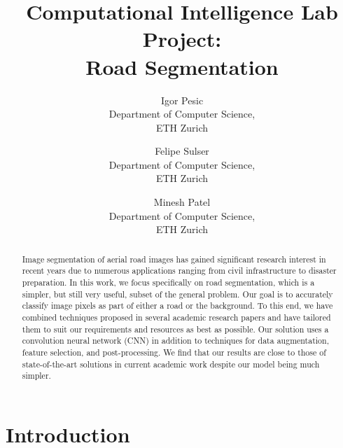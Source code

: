 \documentclass[10pt,conference,compsocconf]{IEEEtran}
\begin{document}
\title{Computational Intelligence Lab Project:\\ Road Segmentation}

\author{
  Igor Pesic\\
  Department of Computer Science,\\ ETH Zurich
  \and
  Felipe Sulser\\
  Department of Computer Science,\\ ETH Zurich
  \and
  Minesh Patel\\
  Department of Computer Science,\\ ETH Zurich
}

\maketitle

\begin{abstract}
  Image segmentation of aerial road images has gained significant research
  interest in recent years due to numerous applications ranging from civil
  infrastructure to disaster preparation. In this work, we focus specifically
  on road segmentation, which is a simpler, but still very useful, subset of
  the general problem. Our goal is to accurately classify image pixels as part
  of either a road or the background. To this end, we have combined techniques
  proposed in several academic research papers and have tailored them to suit
  our requirements and resources as best as possible. Our solution uses a
  convolution neural network (CNN) in addition to techniques for data
  augmentation, feature selection, and post-processing. We find that our
  results are close to those of state-of-the-art solutions in current academic
  work despite our model being much simpler.
\end{abstract}

\section{Introduction}
\end{document}
